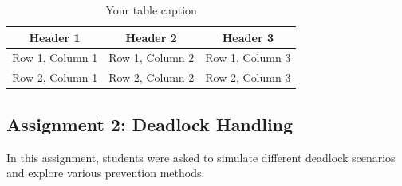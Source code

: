 \documentclass[12pt]{article}
\begin{document}
\begin{table}[htbp] %
    \centering
    \begin{tabular}{|c|c|c|} %
    \hline
    Header 1 & Header 2 & Header 3 \\ %
    \hline
    Row 1, Column 1 & Row 1, Column 2 & Row 1, Column 3 \\ %
    \hline
    Row 2, Column 1 & Row 2, Column 2 & Row 2, Column 3 \\ %
    \hline
    \end{tabular}
    \caption{Your table caption} %
    \label{tab:your_label} %
\end{table}

\subsection{Assignment 2: Deadlock Handling}
In this assignment, students were asked to simulate different deadlock scenarios and explore various prevention methods.
\end{document}
